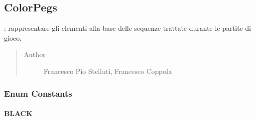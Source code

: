 \documentclass[letterpaper,10pt,italian]{sphinxmanual}
\begin{document}
\subsection{ColorPegs}
\label{\detokenize{source/it/unicam/cs/pa/mastermind/gamecore/ColorPegs:colorpegs}}\label{\detokenize{source/it/unicam/cs/pa/mastermind/gamecore/ColorPegs::doc}}

\begin{fulllineitems}
\label{\detokenize{source/it/unicam/cs/pa/mastermind/gamecore/ColorPegs:it.unicam.cs.pa.mastermind.gamecore.ColorPegs}}
: rappresentare gli elementi alla base delle sequenze trattate durante le partite di gioco.
\begin{quote}\begin{description}
\item[{Author}] \leavevmode
Francesco Pio Stelluti, Francesco Coppola

\end{description}\end{quote}

\end{fulllineitems}



\subsubsection{Enum Constants}
\label{\detokenize{source/it/unicam/cs/pa/mastermind/gamecore/ColorPegs:enum-constants}}

\paragraph{BLACK}
\label{\detokenize{source/it/unicam/cs/pa/mastermind/gamecore/ColorPegs:black}}

\begin{fulllineitems}
\label{\detokenize{source/it/unicam/cs/pa/mastermind/gamecore/ColorPegs:it.unicam.cs.pa.mastermind.gamecore.ColorPegs.BLACK}}
\end{fulllineitems}
\end{document}
